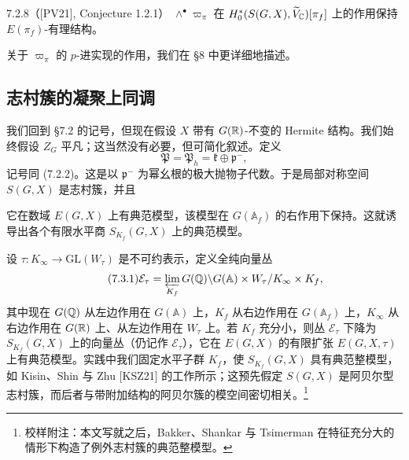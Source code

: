 \begin{conj}{7.2.8}（[PV21], Conjecture 1.2.1）\label{thm:a6-05-3}
$\wedge^\bullet\varpi_\pi$ 在 $H^*_0(S(G,X),\widetilde V_{\mathbb{C}})[\pi_f]$ 上的作用保持 $E(\pi_f)$-有理结构。
\end{conj}

关于 $\varpi_\pi$ 的 $p$-进实现的作用，我们在 §8 中更详细地描述。

\subsection{志村簇的凝聚上同调}

我们回到 §7.2 的记号，但现在假设 $X$ 带有 $G(\mathbb{R})$-不变的 Hermite 结构。我们始终假设 $Z_G$ 平凡；这当然没有必要，但可简化叙述。定义
\[
\mathfrak P=\mathfrak P_h=\mathfrak k\oplus\mathfrak p^-,
\]
记号同 (7.2.2)。这是以 $\mathfrak p^-$ 为幂幺根的极大抛物子代数。于是局部对称空间 $S(G,X)$ 是志村簇，并且

它在数域 $E(G,X)$ 上有典范模型，该模型在 $G(\mathbb A_f)$ 的右作用下保持。这就诱导出各个有限水平商 $S_{K_f}(G,X)$ 上的典范模型。

设 $\tau:K_\infty\to\mathrm{GL}(W_\tau)$ 是不可约表示，定义全纯向量丛
\begin{equation}\tag{7.3.1}\label{eq:a6-05-1}
\mathcal E_\tau=\varprojlim_{K_f}G(\mathbb{Q})\backslash G(\mathbb A)\times W_\tau/K_\infty\times K_f,
\end{equation}
其中现在 $G(\mathbb{Q})$ 从左边作用在 $G(\mathbb A)$ 上，$K_f$ 从右边作用在 $G(\mathbb A_f)$ 上，$K_\infty$ 从右边作用在 $G(\mathbb{R})$ 上、从左边作用在 $W_\tau$ 上。若 $K_f$ 充分小，则丛 $\mathcal E_\tau$ 下降为 $S_{K_f}(G,X)$ 上的向量丛（仍记作 $\mathcal E_\tau$），它在 $E(G,X)$ 的有限扩张 $E(G,X,\tau)$ 上有典范模型。实践中我们固定水平子群 $K_f$，使 $S_{K_f}(G,X)$ 具有典范整模型，如 Kisin、Shin 与 Zhu [KSZ21] 的工作所示；这预先假定 $S(G,X)$ 是阿贝尔型志村簇，而后者与带附加结构的阿贝尔簇的模空间密切相关。\footnote{校样附注：本文写就之后，Bakker、Shankar 与 Tsimerman 在特征充分大的情形下构造了例外志村簇的典范整模型。}

